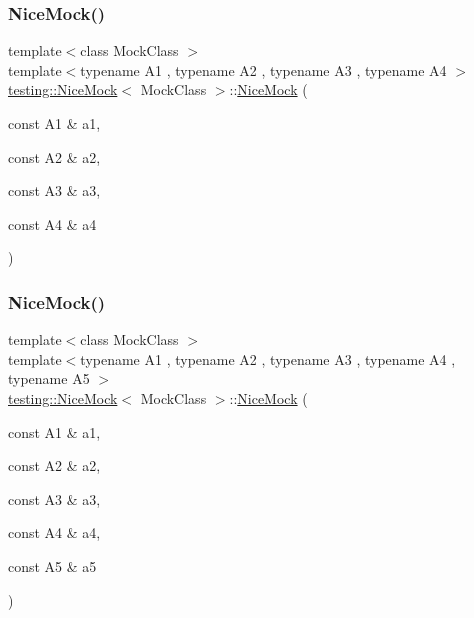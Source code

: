 \subsubsection{\texorpdfstring{NiceMock()}{NiceMock()}\hspace{0.1cm}{\footnotesize\ttfamily [11/17]}}
{\footnotesize\ttfamily template$<$class Mock\+Class $>$ \\
template$<$typename A1 , typename A2 , typename A3 , typename A4 $>$ \\
\mbox{\hyperlink{classtesting_1_1_nice_mock}{testing\+::\+Nice\+Mock}}$<$ Mock\+Class $>$\+::\mbox{\hyperlink{classtesting_1_1_nice_mock}{Nice\+Mock}} (\begin{DoxyParamCaption}\item[{const A1 \&}]{a1,  }\item[{const A2 \&}]{a2,  }\item[{const A3 \&}]{a3,  }\item[{const A4 \&}]{a4 }\end{DoxyParamCaption})\hspace{0.3cm}{\ttfamily [inline]}}

\mbox{\label{classtesting_1_1_nice_mock_a3812c0ba0d743f9a0c3d276dfc076f4c}} 
\subsubsection{\texorpdfstring{NiceMock()}{NiceMock()}\hspace{0.1cm}{\footnotesize\ttfamily [12/17]}}
{\footnotesize\ttfamily template$<$class Mock\+Class $>$ \\
template$<$typename A1 , typename A2 , typename A3 , typename A4 , typename A5 $>$ \\
\mbox{\hyperlink{classtesting_1_1_nice_mock}{testing\+::\+Nice\+Mock}}$<$ Mock\+Class $>$\+::\mbox{\hyperlink{classtesting_1_1_nice_mock}{Nice\+Mock}} (\begin{DoxyParamCaption}\item[{const A1 \&}]{a1,  }\item[{const A2 \&}]{a2,  }\item[{const A3 \&}]{a3,  }\item[{const A4 \&}]{a4,  }\item[{const A5 \&}]{a5 }\end{DoxyParamCaption})\hspace{0.3cm}{\ttfamily [inline]}}

